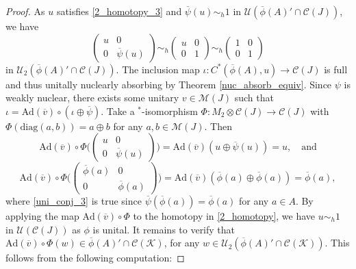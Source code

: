 \documentclass[reqno]{amsart}
\theoremstyle{definition}
\theoremstyle{remark}
\numberwithin{equation}{section}
\theoremstyle{definition}
\newcommand{\calC}{\mathcal{C}}
\newcommand{\calM}{\mathcal{M}}
\newcommand{\calU}{\mathcal{U}}
\newcommand{\calK}{\mathcal{K}}
\begin{document}
\begin{proof}
As $u$ satisfies \eqref{2_homotopy_3} and $\overline{\psi}(u)\sim_{h} 1$ in $\calU(\overline{\phi}(A)'\cap \calC(J))$, we have
\begin{equation} \label{2_homotopy} 
\begin{pmatrix}
u & 0 \\
0 & \overline{\psi}(u) 
\end{pmatrix} 
\sim_{h} 
\begin{pmatrix} 
u & 0 \\
0 & 1
\end{pmatrix} 
\sim_{h}
\begin{pmatrix} 
1 & 0 \\
0 & 1
\end{pmatrix} 
\end{equation} 
in $\calU_{2}(\overline{\phi}(A)'\cap \calC(J))$. The inclusion map $\iota: C^*(\overline{\phi}(A), u) \rightarrow \calC(J)$ is full and thus unitally nuclearly absorbing by Theorem \ref{nuc_absorb_equiv}. Since $\psi$ is weakly nuclear, there exists some unitary $v\in \calM(J)$ such that $\iota = \text{Ad}(\overline{v})\circ (\iota\oplus \overline{\psi})$. Take a $^*$-isomorphism $\Phi: M_{2}\otimes \calC(J) \rightarrow \calC(J)$ with $\Phi(\text{diag}(a, b)) = a\oplus b$ for any $a, b \in \calM(J)$. Then 
\begin{equation} 
\text{Ad}(\overline{v}) \circ \Phi \bigg(
\begin{pmatrix}
u & 0 \\
0 & \overline{\psi}(u) 
\end{pmatrix}
\bigg) = \text{Ad}(\overline{v}) (u \oplus \overline{\psi}(u)) = u, \quad \text{and}
\end{equation} 
\begin{equation} \label{uni_conj_3} 
\text{Ad}(\overline{v}) \circ \Phi \bigg(
\begin{pmatrix}
\overline{\phi}(a) & 0 \\
0 & \overline{\phi}(a)  
\end{pmatrix}
\bigg) = \text{Ad}(\overline{v}) (\overline{\phi}(a)\oplus \overline{\phi}(a)) = \overline{\phi}(a), 
\end{equation} 
where \eqref{uni_conj_3} is true since $\overline{\psi} (\overline{\phi}(a)) =\overline{\phi}(a)$ for any $a\in A$. By applying the map $\text{Ad}(\overline{v}) \circ \Phi$ to the homotopy in \eqref{2_homotopy}, we have $u\sim_{h} 1$ in $\mathcal U(\calC(J))$ as $\phi$ is unital. It remains to verify that $\text{Ad}(\overline{v}) \circ \Phi (w) \in \overline{\phi}(A)'\cap \calC(\calK)$, for any $w\in\calU_{2}(\overline{\phi}(A)'\cap \calC(\calK))$. This follows from the following computation: 

\end{proof}
\end{document}
